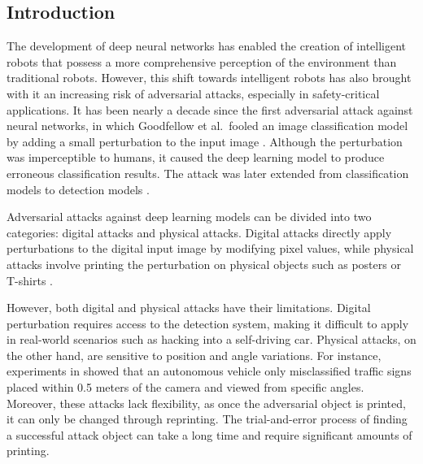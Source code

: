 
\subsection{Introduction}

The development of deep neural networks has enabled the creation of intelligent robots that possess a more comprehensive perception of the environment than traditional robots. However, this shift towards intelligent robots has also brought with it an increasing risk of adversarial attacks, especially in safety-critical applications. It has been nearly a decade since the first adversarial attack against neural networks, in which Goodfellow et al.\ fooled an image classification model by adding a small perturbation to the input image \citep{GoodfellowSS14}. Although the perturbation was imperceptible to humans, it caused the deep learning model to produce erroneous classification results. The attack was later extended from classification models to detection models \citep{LuSFF17}. 


Adversarial attacks against deep learning models can be divided into two categories: digital attacks and physical attacks. Digital attacks directly apply perturbations to the digital input image by modifying pixel values, while physical attacks involve printing the perturbation on physical objects such as posters \citep{lee2019physical} or T-shirts \citep{xu2020adversarial}.

However, both digital and physical attacks have their limitations. Digital perturbation requires access to the detection system, making it difficult to apply in real-world scenarios such as hacking into a self-driving car. Physical attacks, on the other hand, are sensitive to position and angle variations. For instance, experiments in \citep{LuSFF17} showed that an autonomous vehicle only misclassified traffic signs placed within 0.5 meters of the camera and viewed from specific angles. Moreover, these attacks lack flexibility, as once the adversarial object is printed, it can only be changed through reprinting. The trial-and-error process of finding a successful attack object can take a long time and require significant amounts of printing.

